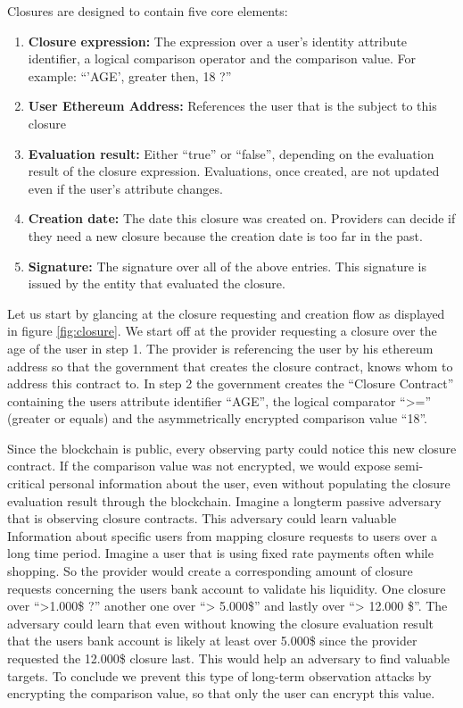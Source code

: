 \noindent Closures are designed to contain five core elements:
\begin{enumerate}
\item \textbf{Closure expression:} The expression over a user’s identity attribute identifier, a logical comparison operator and the comparison value. For example: “’AGE’, greater then, 18 ?”
\item \textbf{User Ethereum Address:} References the user that is the subject to this closure
\item \textbf{Evaluation result:} Either “true” or “false”, depending on the evaluation result of the closure expression. Evaluations, once created, are not updated even if the user’s attribute changes.
\item \textbf{Creation date:} The date this closure was created on. Providers can decide if they need a new closure because the creation date is too far in the past.
\item \textbf{Signature:} The signature over all of the above entries. This signature is issued by the entity that evaluated the closure.
\end{enumerate}

Let us start by glancing at the closure requesting and creation flow as displayed in figure \ref{fig:closure}. We start off at the provider requesting a closure over the age of the user in step 1.
The provider is referencing the user by his ethereum address so that the government that creates the closure contract, knows whom to address this contract to. In step 2 the government creates the “Closure Contract” containing the users attribute identifier “AGE”, the logical comparator “>=” (greater or equals) and the asymmetrically encrypted comparison value “18”.

Since the blockchain is public, every observing party could notice this new closure contract. If the comparison value was not encrypted, we would expose semi-critical personal information about the user, even without populating the closure evaluation result through the blockchain. Imagine a longterm passive adversary that is observing closure contracts. This adversary could learn valuable Information about specific users from mapping closure requests to users over a long time period. Imagine a user that is using fixed rate payments often while shopping. So the provider would create a corresponding amount of closure requests concerning the users bank account to validate his liquidity. One closure over “>1.000\$ ?”  another one over “> 5.000\$” and lastly over “> 12.000 \$”. The adversary could learn that even without knowing the closure evaluation result that the users bank account is likely at least over 5.000\$ since the provider requested the 12.000\$ closure last. This would help an adversary to find valuable targets.
To conclude we prevent this type of long-term observation attacks by encrypting the comparison value, so that only the user can encrypt this value.

